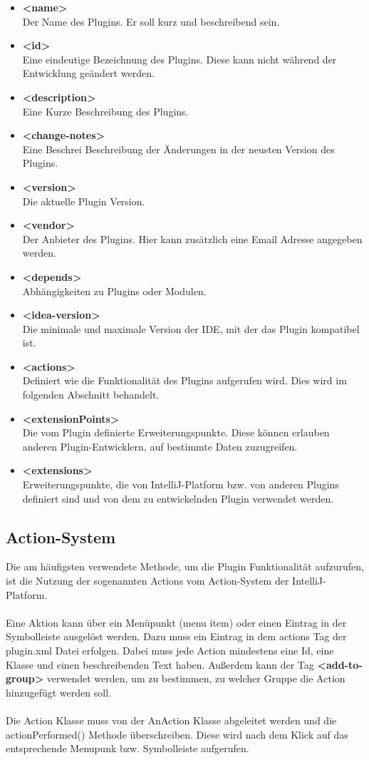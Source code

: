 \begin{itemize}
	\item \textbf{<name>} \\
	Der Name des Plugins. Er soll kurz und beschreibend sein.
	\item \textbf{<id>} \\
	Eine eindeutige Bezeichnung des Plugins. Diese kann nicht während der Entwicklung geändert werden.
	\item \textbf{<description>} \\
	Eine Kurze Beschreibung des Plugins.
	\item \textbf{<change-notes>} \\
	Eine Beschrei Beschreibung der Änderungen in der neusten Version des Plugins.
	\item \textbf{<version>} \\
	Die aktuelle Plugin Version.
	\item \textbf{<vendor>} \\
	Der Anbieter des Plugins. Hier kann zusätzlich eine Email Adresse angegeben werden.
	\item \textbf{<depends>} \\
	Abhängigkeiten zu Plugins oder Modulen.
	\item \textbf{<idea-version>} \\
	Die minimale und maximale Version der IDE, mit der das Plugin kompatibel ist.
	\item \textbf{<actions>} \\
	Definiert wie die Funktionalität des Plugins aufgerufen wird. Dies wird im folgenden Abschnitt behandelt.
	\item \textbf{<extensionPoints>} \\
	Die vom Plugin definierte Erweiterungspunkte. Diese können erlauben anderen Plugin-Entwicklern, auf bestimmte Daten zuzugreifen. 
	\item \textbf{<extensions>} \\
	Erweiterungspunkte, die von IntelliJ-Platform bzw. von anderen Plugins definiert sind und von dem zu entwickelnden Plugin verwendet werden.
\end{itemize}
\subsection{Action-System}
Die am häufigsten verwendete Methode, um die Plugin Funktionalität aufzurufen, ist die Nutzung der sogenannten Actions vom Action-System der IntelliJ-Platform.\\ \\
Eine Aktion kann über ein Menüpunkt (menu item) oder einen Eintrag in der Symbolleiste ausgelöst werden. Dazu muss ein Eintrag in dem actions Tag der plugin.xml Datei erfolgen. Dabei muss jede Action mindestens eine Id, eine Klasse und einen beschreibenden Text haben. Außerdem kann der Tag \textbf{<add-to-group>} verwendet werden, um zu bestimmen, zu welcher Gruppe die Action hinzugefügt werden soll.\\ \\
Die Action Klasse muss von der AnAction Klasse abgeleitet werden und die actionPerformed() Methode überschreiben. Diese wird nach dem Klick auf das entsprechende Menupunk bzw. Symbolleiste aufgerufen.

